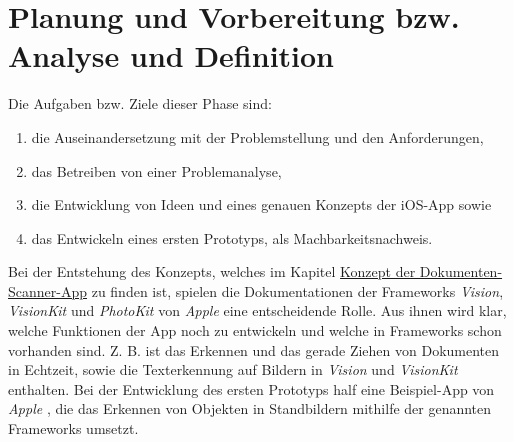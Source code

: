 \documentclass[nomenclature, oneside, 150]{HSMW-Thesis}
\begin{document}
	\section{Planung und Vorbereitung bzw. Analyse und Definition}
		Die Aufgaben bzw. Ziele dieser Phase sind:
		\begin{enumerate}
			\item die Auseinandersetzung mit der Problemstellung und den Anforderungen,
			\item das Betreiben von einer Problemanalyse,
			\item die Entwicklung von Ideen und eines genauen Konzepts der iOS-App sowie 
			\item das Entwickeln eines ersten Prototyps, als Machbarkeitsnachweis.
		\end{enumerate}
		
		Bei der Entstehung des Konzepts, welches im Kapitel \hyperlink{konzept}{Konzept der Dokumenten-Scanner-App} zu finden ist, spielen die Dokumentationen der Frameworks \textit{Vision}, \textit{VisionKit} und \textit{PhotoKit} von \textit{Apple} eine entscheidende Rolle. Aus ihnen wird klar, welche Funktionen der App noch zu entwickeln und welche in Frameworks schon vorhanden sind. Z. B. ist das Erkennen und das gerade Ziehen von Dokumenten in Echtzeit, sowie die Texterkennung auf Bildern in \textit{Vision} und \textit{VisionKit} enthalten. Bei der Entwicklung des ersten Prototyps half eine Beispiel-App von \textit{Apple} \cite{noauthor_detecting_nodate}, die das Erkennen von Objekten in Standbildern mithilfe der genannten Frameworks umsetzt.
		
\end{document}
